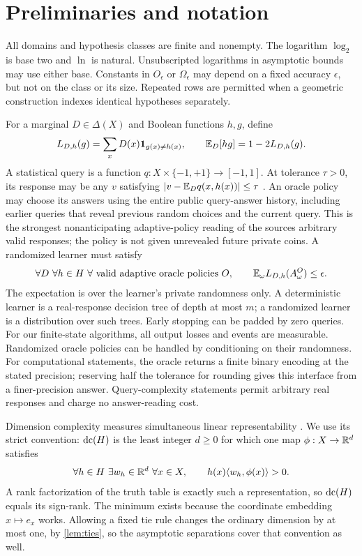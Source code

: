 \section{Preliminaries and notation}\label{sec:preliminaries}
All domains and hypothesis classes are finite and nonempty. The logarithm $\log_2$ is base two and $\ln$ is natural. Unsubscripted logarithms in asymptotic bounds may use either base. Constants in $O_\epsilon$ or $\Omega_\epsilon$ may depend on a fixed accuracy $\epsilon$, but not on the class or its size. Repeated rows are permitted when a geometric construction indexes identical hypotheses separately.

For a marginal $D\in\Delta(X)$ and Boolean functions $h,g$, define
\[
 L_{D,h}(g)=\sum_xD(x)\mathbf 1_{g(x)\ne h(x)},\qquad
 \mathbb E_D[hg]=1-2L_{D,h}(g).
\]
A statistical query is a function $q:X\times\{-1,+1\}\to[-1,1]$. At tolerance $\tau>0$, its response may be any $v$ satisfying
$|v-\mathbb E_Dq(x,h(x))|\le\tau$ \citep{Kearns98}. An oracle policy may choose its answers using the entire public query-answer history, including earlier queries that reveal previous random choices and the current query. This is the strongest nonanticipating adaptive-policy reading of the source\textquotesingle s arbitrary valid responses; the policy is not given unrevealed future private coins. A randomized learner must satisfy
\begin{equation}\label{eq:guarantee}
 \forall D\ \forall h\in H\ \forall\text{ valid adaptive oracle policies }O,
 \qquad\mathbb E_\omega L_{D,h}(A^O_\omega)\le\epsilon.
\end{equation}
The expectation is over the learner's private randomness only. A deterministic learner is a real-response decision tree of depth at most $m$; a randomized learner is a distribution over such trees. Early stopping can be padded by zero queries. For our finite-state algorithms, all output losses and events are measurable. Randomized oracle policies can be handled by conditioning on their randomness. For computational statements, the oracle returns a finite binary encoding at the stated precision; reserving half the tolerance for rounding gives this interface from a finer-precision answer. Query-complexity statements permit arbitrary real responses and charge no answer-reading cost.

Dimension complexity measures simultaneous linear representability \citep{BDES02}. We use its strict convention: $\operatorname{dc}(H)$ is the least integer $d\ge0$ for which one map $\phi:X\to\mathbb R^d$ satisfies
\begin{equation}\label{eq:strict}
 \forall h\in H\ \exists w_h\in\mathbb R^d\ \forall x\in X,
 \qquad h(x)\langle w_h,\phi(x)\rangle>0.
\end{equation}
A rank factorization of the truth table is exactly such a representation, so $\operatorname{dc}(H)$ equals its sign-rank. The minimum exists because the coordinate embedding $x\mapsto e_x$ works. Allowing a fixed tie rule changes the ordinary dimension by at most one, by \cref{lem:ties}, so the asymptotic separations cover that convention as well.

